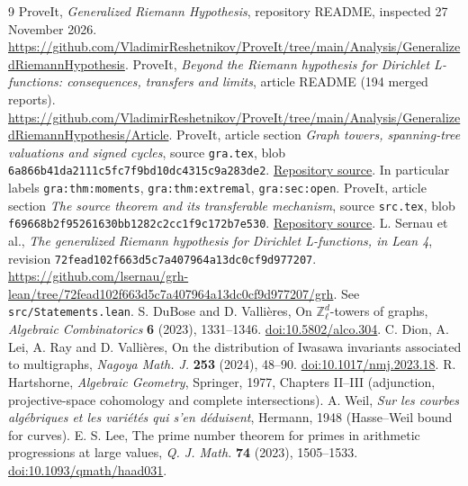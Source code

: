 \documentclass[11pt]{article}
\theoremstyle{remark}\newtheorem{remark}[theorem]{Remark}
\newcommand{\Z}{\mathbb Z}
\begin{document}
\begin{thebibliography}{9}\small
{} ProveIt, \emph{Generalized Riemann Hypothesis}, repository README, inspected 27 November 2026. \url{https://github.com/VladimirReshetnikov/ProveIt/tree/main/Analysis/GeneralizedRiemannHypothesis}.
 ProveIt, \emph{Beyond the Riemann hypothesis for Dirichlet L-functions: consequences, transfers and limits}, article README (194 merged reports). \url{https://github.com/VladimirReshetnikov/ProveIt/tree/main/Analysis/GeneralizedRiemannHypothesis/Article}.
 ProveIt, article section \emph{Graph towers, spanning-tree valuations and signed cycles}, source \texttt{gra.tex}, blob \texttt{6a866b41da2111c5fc7f9bd10dc4315c9a283de2}. \href{https://github.com/VladimirReshetnikov/ProveIt/blob/main/Analysis/GeneralizedRiemannHypothesis/Article/sections/gra.tex}{Repository source}. In particular labels \texttt{gra:thm:moments}, \texttt{gra:thm:extremal}, \texttt{gra:sec:open}.
 ProveIt, article section \emph{The source theorem and its transferable mechanism}, source \texttt{src.tex}, blob \texttt{f69668b2f95261630bb1282c2cc1f9c172b7e530}. \href{https://github.com/VladimirReshetnikov/ProveIt/blob/main/Analysis/GeneralizedRiemannHypothesis/Article/sections/src.tex}{Repository source}.
 L. Sernau et al., \emph{The generalized Riemann hypothesis for Dirichlet L-functions, in Lean 4}, revision \texttt{72fead102f663d5c7a407964a13dc0cf9d977207}. \url{https://github.com/lsernau/grh-lean/tree/72fead102f663d5c7a407964a13dc0cf9d977207/grh}. See \texttt{src/Statements.lean}.
 S. DuBose and D. Valli\`eres, On $\Z_\ell^d$-towers of graphs, \emph{Algebraic Combinatorics} \textbf{6} (2023), 1331--1346. \href{https://doi.org/10.5802/alco.304}{doi:10.5802/alco.304}.
 C. Dion, A. Lei, A. Ray and D. Valli\`eres, On the distribution of Iwasawa invariants associated to multigraphs, \emph{Nagoya Math. J.} \textbf{253} (2024), 48--90. \href{https://doi.org/10.1017/nmj.2023.18}{doi:10.1017/nmj.2023.18}.
 R. Hartshorne, \emph{Algebraic Geometry}, Springer, 1977, Chapters II--III (adjunction, projective-space cohomology and complete intersections).
 A. Weil, \emph{Sur les courbes alg\'ebriques et les vari\'et\'es qui s'en d\'eduisent}, Hermann, 1948 (Hasse--Weil bound for curves).
 E. S. Lee, The prime number theorem for primes in arithmetic progressions at large values, \emph{Q. J. Math.} \textbf{74} (2023), 1505--1533. \href{https://doi.org/10.1093/qmath/haad031}{doi:10.1093/qmath/haad031}.
\end{thebibliography}
\end{document}
